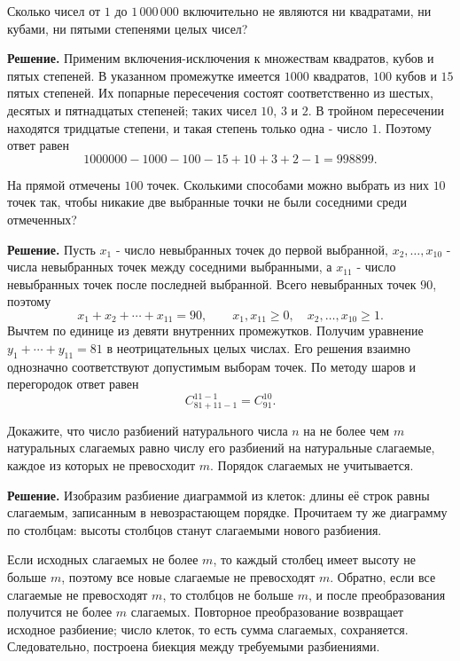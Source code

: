 \begin{problems}
\item Сколько чисел от $1$ до $1\,000\,000$ включительно не являются ни квадратами, ни кубами, ни пятыми степенями целых чисел?
\par\smallskip\noindent\textbf{Решение.} Применим включения-исключения к множествам квадратов, кубов и пятых степеней. В указанном промежутке имеется $1000$ квадратов, $100$ кубов и $15$ пятых степеней. Их попарные пересечения состоят соответственно из шестых, десятых и пятнадцатых степеней; таких чисел $10$, $3$ и $2$. В тройном пересечении находятся тридцатые степени, и такая степень только одна - число $1$. Поэтому ответ равен
\[
1000000-1000-100-15+10+3+2-1=998899.
\]\par

\item На прямой отмечены $100$ точек. Сколькими способами можно выбрать из них $10$ точек так, чтобы никакие две выбранные точки не были соседними среди отмеченных?
\par\smallskip\noindent\textbf{Решение.} Пусть $x_1$ - число невыбранных точек до первой выбранной, $x_2,\ldots,x_{10}$ - числа невыбранных точек между соседними выбранными, а $x_{11}$ - число невыбранных точек после последней выбранной. Всего невыбранных точек $90$, поэтому
\[
x_1+x_2+\cdots+x_{11}=90,
\qquad x_1,x_{11}\ge0,\quad x_2,\ldots,x_{10}\ge1.
\]
Вычтем по единице из девяти внутренних промежутков. Получим уравнение $y_1+\cdots+y_{11}=81$ в неотрицательных целых числах. Его решения взаимно однозначно соответствуют допустимым выборам точек. По методу шаров и перегородок ответ равен
\[
C_{81+11-1}^{11-1}=C_{91}^{10}.
\]\par

\item Докажите, что число разбиений натурального числа $n$ на не более чем $m$ натуральных слагаемых равно числу его разбиений на натуральные слагаемые, каждое из которых не превосходит $m$. Порядок слагаемых не учитывается.
\par\smallskip\noindent\textbf{Решение.} Изобразим разбиение диаграммой из клеток: длины её строк равны слагаемым, записанным в невозрастающем порядке. Прочитаем ту же диаграмму по столбцам: высоты столбцов станут слагаемыми нового разбиения.
\par Если исходных слагаемых не более $m$, то каждый столбец имеет высоту не больше $m$, поэтому все новые слагаемые не превосходят $m$. Обратно, если все слагаемые не превосходят $m$, то столбцов не больше $m$, и после преобразования получится не более $m$ слагаемых. Повторное преобразование возвращает исходное разбиение; число клеток, то есть сумма слагаемых, сохраняется. Следовательно, построена биекция между требуемыми разбиениями.\par


\end{problems}
